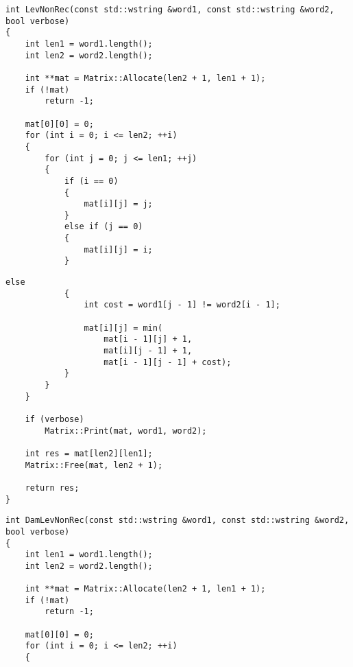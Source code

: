 \begin{lstlisting}[caption=Матричный алгоритм поиска расстояния Левенштейна (часть 1)]
int LevNonRec(const std::wstring &word1, const std::wstring &word2, bool verbose)
{
    int len1 = word1.length();
    int len2 = word2.length();

    int **mat = Matrix::Allocate(len2 + 1, len1 + 1);
    if (!mat)
        return -1;

    mat[0][0] = 0;
    for (int i = 0; i <= len2; ++i)
    {
        for (int j = 0; j <= len1; ++j)
        {
            if (i == 0)
            {
                mat[i][j] = j;
            }
            else if (j == 0)
            {
                mat[i][j] = i;
            }
\end{lstlisting}

\clearpage
\begin{lstlisting}[caption=Матричный алгоритм поиска расстояния Левенштейна (часть 2)]
            else
            {
                int cost = word1[j - 1] != word2[i - 1];

                mat[i][j] = min(
                    mat[i - 1][j] + 1,
                    mat[i][j - 1] + 1,
                    mat[i - 1][j - 1] + cost);
            }
        }
    }

    if (verbose)
        Matrix::Print(mat, word1, word2);

    int res = mat[len2][len1];
    Matrix::Free(mat, len2 + 1);

    return res;
}
\end{lstlisting}

\begin{lstlisting}[caption=Матричный алгоритм поиска расстояния Дамерау~---~Левенштейна (часть 1)]
int DamLevNonRec(const std::wstring &word1, const std::wstring &word2, bool verbose)
{
    int len1 = word1.length();
    int len2 = word2.length();

    int **mat = Matrix::Allocate(len2 + 1, len1 + 1);
    if (!mat)
        return -1;

    mat[0][0] = 0;
    for (int i = 0; i <= len2; ++i)
    {
\end{lstlisting}

